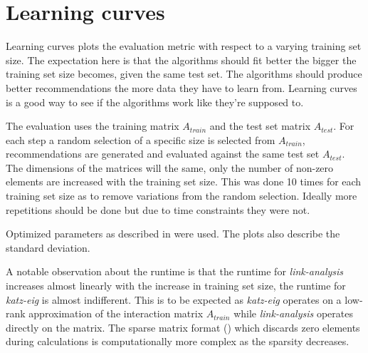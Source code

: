 
\section{Learning curves}\label{sec:graphs:learning_curves}

Learning curves plots the evaluation metric with respect to a varying training set size. The expectation here is that the algorithms should fit better the bigger the training set size becomes, given the same test set. The algorithms should produce better recommendations the more data they have to learn from. Learning curves is a good way to see if the algorithms work like they're supposed to.

The evaluation uses the training matrix $A_{train}$ and the test set matrix $A_{test}$. For each step a random selection of a specific size is selected from $A_{train}$, recommendations are generated and evaluated against the same test set $A_{test}$. The dimensions of the matrices will the same, only the number of non-zero elements are increased with the training set size. This was done 10 times for each training set size as to remove variations from the random selection. Ideally more repetitions should be done but due to time constraints they were not.

Optimized parameters as described in  were used. The plots also describe the standard deviation.

\FloatBarrier

A notable observation about the runtime is that the runtime for \textit{link-analysis} increases almost linearly with the increase in training set size, the runtime for \textit{katz-eig} is almost indifferent. This is to be expected as \textit{katz-eig} operates on a low-rank approximation of the interaction matrix $A_{train}$ while \textit{link-analysis} operates directly on the matrix. The sparse matrix format () which discards zero elements during calculations is computationally more complex as the sparsity decreases.

\FloatBarrier

